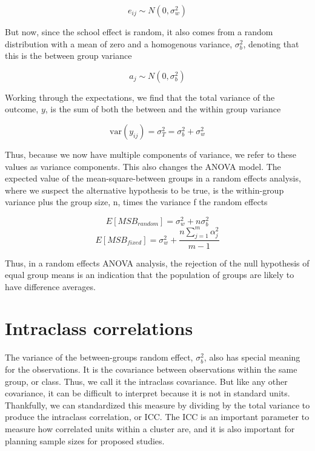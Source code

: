 \begin{equation}
    e_{ij} \sim N\left(0,\sigma^2_w\right)
\end{equation}

But now, since the school effect is random, it also comes from a random distribution with a mean of zero and a homogenous variance, $\sigma^2_b$, denoting that this is the between group variance

\begin{equation}
  a_j \sim N\left(0,\sigma^2_b\right)
\end{equation}

Working through the expectations, we find that the total variance of the outcome, $y$, is the sum of both the between and the within group variance

\begin{equation}
  \mbox{var}\left(y_{ij}\right) = \sigma_T^2 = \sigma_b^2 + \sigma_w^2
\end{equation}

Thus, because we now have multiple components of variance, we refer to these values as variance components. This also changes the ANOVA model. The expected value of the mean-square-between groups in a random effects analysis, where we suspect the alternative hypothesis to be true, is the within-group variance plus the group size, n, times the variance f the random effects

\[
E[MSB_{random}] = \sigma_w^2 + n\sigma_b^2
\]
\[
E[MSB_{fixed}] = \sigma_w^2 + \frac{n\sum_{j=1}^m\alpha_j^2}{m-1}
\]

Thus, in a random effects ANOVA analysis, the rejection of the null hypothesis of equal group means is an indication that the population of groups are likely to have difference averages.

\section{Intraclass correlations}

The variance of the between-groups random effect, $\sigma_b^2$, also has special meaning for the observations. It is the covariance between observations within the same group, or class. Thus, we call it the intraclass covariance. But like any other covariance, it can be difficult to interpret because it is not in standard units. Thankfully, we can standardized this measure by dividing by the total variance to produce the intraclass correlation, or ICC. The ICC is an important parameter to measure how correlated units within a cluster are, and it is also important for planning sample sizes for proposed studies.

